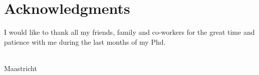 \chapter{Acknowledgments}
I would like to thank all my friends, family and co-workers for the great time and patience with me during the last months of my Phd.

{\flushright \thesisauthor \\ Maastricht \\ \thesisdate \\ }